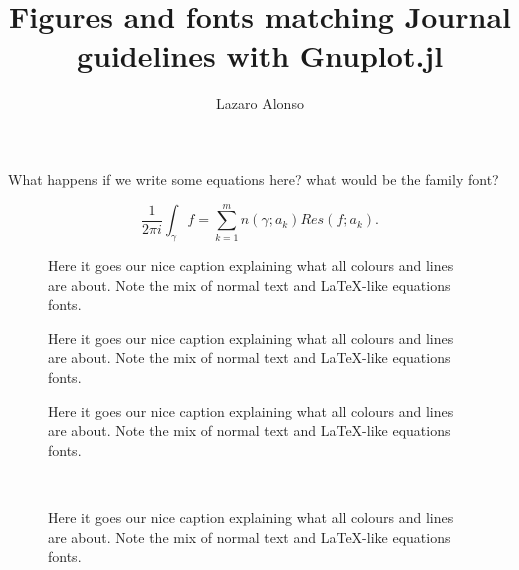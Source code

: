 \documentclass[11pt]{amsart}
\title{Figures and fonts matching Journal guidelines with Gnuplot.jl}
\author{Lazaro Alonso}
\begin{document}
\maketitle
What happens if we write some equations here? what would be the family font?

\begin{equation}
\frac{1}{2\pi i} \int_{\gamma} f = \sum_{k=1}^{m} n(\gamma; a_{k}) Res(f; a_{k}).
\end{equation}

\begin{figure}
\resizebox{.48\linewidth}{!}{}
\resizebox{.48\linewidth}{!}{}

  \caption{Here it goes our nice caption explaining what all colours and lines are about. Note the mix of normal text and
  \LaTeX -like equations fonts.}
\end{figure}

\begin{figure}
  \resizebox{.48\linewidth}{!}{}
  \resizebox{.48\linewidth}{!} {}

  \caption{Here it goes our nice caption explaining what all colours and lines are about. Note the mix of normal text and
  \LaTeX -like equations fonts.}
\end{figure}


\begin{figure}
  \resizebox{.48\linewidth}{!}{}
  \resizebox{.48\linewidth}{!}{}
  \caption{Here it goes our nice caption explaining what all colours and lines are about. Note the mix of normal text and
  \LaTeX -like equations fonts.}
\end{figure}

\begin{figure}
\resizebox{.48\linewidth}{!} {}
  \resizebox{.48\linewidth}{!} {\textcolor{white}{
  {
  }}}\\
  {\footnotesize

}
  \caption{Here it goes our nice caption explaining what all colours and lines are about. Note the mix of normal text and
  \LaTeX -like equations fonts.}
\end{figure}
\end{document}
